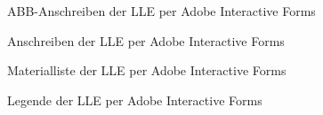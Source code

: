 \begin{figure}[ht] 
	\caption{ABB-Anschreiben der \acs{LLE} per Adobe Interactive Forms}
	\label{AN:lle-pdf-1}
\end{figure} 
\begin{figure}[ht] 
	\caption{Anschreiben der \acs{LLE} per Adobe Interactive Forms}
	\label{AN:lle-pdf-2}
\end{figure} 
\begin{figure}[ht] 
	\caption{Materialliste der \acs{LLE} per Adobe Interactive Forms}
	\label{AN:lle-pdf-3}
\end{figure} 
\begin{figure}[ht] 
	\caption{Legende der \acs{LLE} per Adobe Interactive Forms}
	\label{AN:lle-pdf-4}
\end{figure} 




